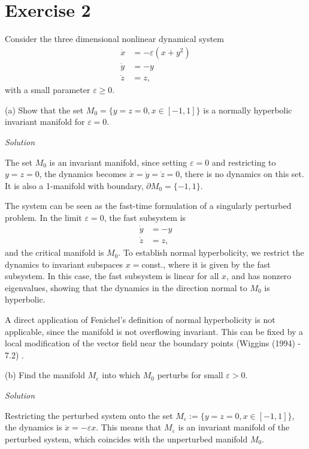 \documentclass[a4paper,11pt,pdftex]{article}
\begin{document}
\section*{Exercise 2}
Consider the three dimensional nonlinear dynamical system
\begin{align}
   \label{eqsys2}
     \dot{x} &= -\varepsilon(x + y^2) \\
    \dot{y} &= -y \\
    \dot{z} &= z,
\end{align}
with a small parameter $\varepsilon\geq 0$.

(a) Show that the set $M_0 = \{ y=z=0, x\in [-1,1]\}$ is a normally hyperbolic invariant manifold for $\varepsilon = 0$.

\emph{Solution}

The set $M_0$ is an invariant manifold, since setting $\varepsilon =0$ and restricting to $y=z=0$, the dynamics becomes $\dot{x}=\dot{y}=\dot{z}=0$, there is no dynamics on this set. It is also a 1-manifold with boundary, $\partial M_0 = \{ -1, 1\}$. 

The system can be seen as the fast-time formulation of a singularly perturbed problem. In the limit $\varepsilon =0$, the fast subsystem is 
\begin{align*}
    \dot{y} &= -y \\
    \dot{z} &= z,
\end{align*}
and the critical manifold is $M_0$. To establish normal hyperbolicity, we restrict the dynamics to invariant subspaces $x=$const., where it is given by the fast subsystem. In this case, the fast subsystem is linear for all $x$, and has nonzero eigenvalues, showing that the dynamics in the direction normal to $M_0$ is hyperbolic. 

A direct application of Fenichel's definition of normal hyperbolicity is not applicable, since the manifold is not overflowing invariant. This can be fixed by a local modification of the vector field near the boundary points (Wiggins (1994) - 7.2) . 

(b) Find the manifold $M_\varepsilon$ into which $M_0$ perturbs for small $\varepsilon>0$.

\emph{Solution}

Restricting the perturbed system onto the set $M_\varepsilon := \{ y=z=0, x\in [-1,1]\}$, the dynamics is  $\dot{x} = -\varepsilon x$. This means that $M_\varepsilon$ is an invariant manifold of the perturbed system, which coincides with the unperturbed manifold $M_0$. 
\end{document}
